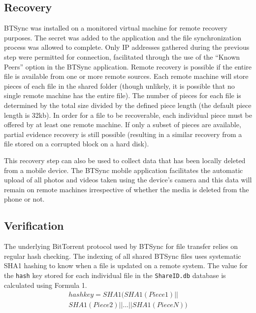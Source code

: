 \documentclass{jdfsl}
\begin{document}
\subsection{Recovery}
\label{POC:Rec}
BTSync was installed on a monitored virtual machine for remote recovery purposes. The secret was added to the application and the file synchronization process was allowed to complete. Only IP addresses gathered during the previous step were permitted for connection, facilitated through the use of the ``Known Peers'' option in the BTSync application. Remote recovery is possible if the entire file is available from one or more remote sources. Each remote machine will store pieces of each file in the shared folder (though unlikely, it is possible that no single remote machine has the entire file). The number of pieces for each file is determined by the total size divided by the defined piece length (the default piece length is 32kb). In order for a file to be recoverable, each individual piece must be offered by at least one remote machine. If only a subset of pieces are available, partial evidence recovery is still possible (resulting in a similar recovery from a file stored on a corrupted block on a hard disk).

This recovery step can also be used to collect data that has been locally deleted from a mobile device. The BTSync mobile application facilitates the automatic upload of all photos and videos taken using the device's camera and this data will remain on remote machines irrespective of whether the media is deleted from the phone or not.\\


\subsection{Verification}
\label{POCVerification}

The underlying BitTorrent protocol used by BTSync for file transfer relies on regular hash checking. The indexing of all shared BTSync files uses systematic SHA1 hashing to know when a file is updated on a remote system. The value for the \texttt{hash} key stored for each individual file in the \texttt{ShareID.db} database is calculated using Formula 1.\\
\begin{equation}
\begin{split}
	hash key = SHA1(SHA1(Piece1)||\\SHA1(Piece2)||...||SHA1(PieceN))
\end{split}
\end{equation}
\\
\end{document}
